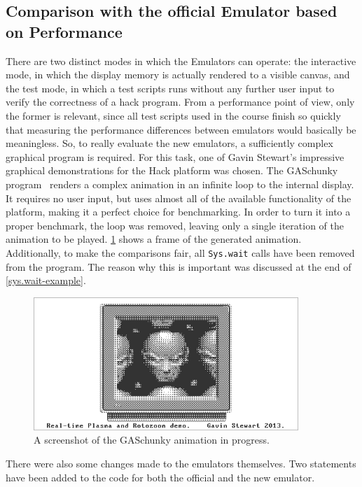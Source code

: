 \subsection{Comparison with the official Emulator based on Performance} \label{sec:benchmarks}
There are two distinct modes in which the Emulators can operate: the interactive mode, in which the display memory is actually rendered to a visible canvas, and the test mode, in which a test scripts runs without any further user input to verify the correctness of a hack program.
From a performance point of view, only the former is relevant, since all test scripts used in the course finish so quickly that measuring the performance differences between emulators would basically be meaningless.
So, to really evaluate the new emulators, a sufficiently complex graphical program is required.
For this task, one of Gavin Stewart's impressive graphical demonstrations for the Hack platform was chosen.
The GASchunky program~\cite{demos} renders a complex animation in an infinite loop to the internal display.
It requires no user input, but uses almost all of the available functionality of the platform, making it a perfect choice for benchmarking.
In order to turn it into a proper benchmark, the loop was removed, leaving only a single iteration of the animation to be played.
\cref{fig:gaschunky-screenshot} shows a frame of the generated animation.
Additionally, to make the comparisons fair, all \verb+Sys.wait+ calls have been removed from the program.
The reason why this is important was discussed at the end of \cref{sys.wait-example}.
\begin{center}
  \begin{figure}[ht]
    \centering
    \includegraphics[width=10cm]{fig/gaschunky.png}
    \caption{A screenshot of the GASchunky animation in progress.}%
    \label{fig:gaschunky-screenshot}
  \end{figure}
\end{center}
There were also some changes made to the emulators themselves.
Two statements have been added to the code for both the official and the new emulator.
